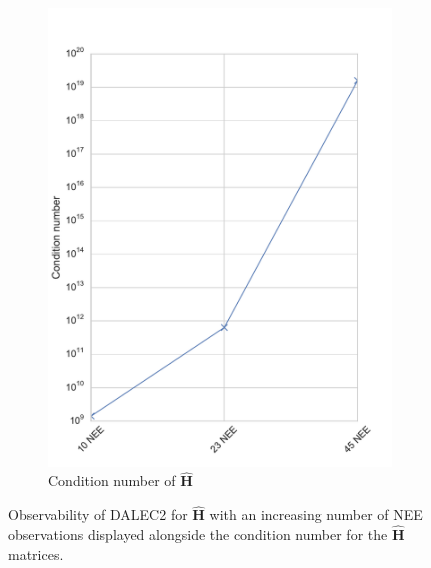 \begin{figure}[ht]
\begin{subfigure}[b]{0.4\textwidth}
        \includegraphics[width=\textwidth]{chapter/chapter5/dalec2_obsrankcond.pdf}
        \caption{Condition number of $\hat{\textbf{H}}$}
        \label{chap5:fig:D2_observabilitycond}
    \end{subfigure}
    \caption{Observability of DALEC2 for $\hat{\textbf{H}}$ with an increasing number of NEE observations displayed alongside the condition number for the $\hat{\textbf{H}}$ matrices.}
    \label{chap5:fig:D2_observability}
\end{figure}

